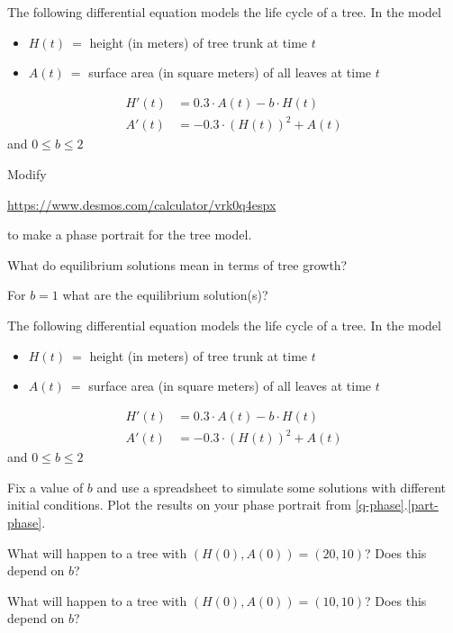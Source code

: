 \documentclass{workbook}
\begin{document}
\begin{slide}
	\question
	\label{q-phase}
	The following differential equation models the life cycle of a tree.
	In the model
	\begin{itemize}
		\item $H(t)\ =$ height (in meters) of tree trunk at time $t$
		\item $A(t)\ =$ surface area (in square meters) of all leaves at time $t$
	\end{itemize}
	\begin{align*}
		H'(t) &= 0.3\cdot A(t)-b\cdot H(t)\\
		A'(t) &= -0.3\cdot (H(t))^2 + A(t)
	\end{align*}
	and $0 \leq b \leq 2$

	\bigskip
	\phantom{x}
	\begin{parts}
		\item 
		\label{part-phase}
		Modify 

		{\small
		\url{https://www.desmos.com/calculator/vrk0q4espx}
		}

		to make a phase portrait for the tree model.
		\item What do equilibrium solutions mean in terms of tree growth?
		\item For $b=1$ what are the equilibrium solution(s)?
	\end{parts}
	\bigskip
	\phantom{x}
\end{slide}

\begin{slide}
	\question
	The following differential equation models the life cycle of a tree.
	In the model
	\begin{itemize}
		\item $H(t)\ =$ height (in meters) of tree trunk at time $t$
		\item $A(t)\ =$ surface area (in square meters) of all leaves at time $t$
	\end{itemize}
	\begin{align*}
		H'(t) &= 0.3\cdot A(t)-b\cdot H(t)\\
		A'(t) &= -0.3\cdot (H(t))^2 + A(t)
	\end{align*}
	and $0 \leq b \leq 2$

	\bigskip
	\phantom{x}
	\begin{parts}
		\item Fix a value of $b$ and use a spreadsheet to simulate some solutions with different initial conditions.
		Plot the results on your phase portrait from \ref{q-phase}.\ref{part-phase}.
		\item What will happen to a tree with $(H(0), A(0))=(20,10)$? Does this depend on $b$?
		\item What will happen to a tree with $(H(0), A(0))=(10,10)$? Does this depend on $b$?
	\end{parts}
	\bigskip
	\phantom{x}
\end{slide}
\end{document}

